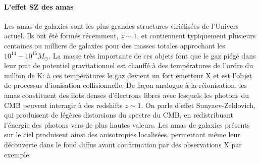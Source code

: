 \paragraph{L'effet SZ des amas}
Les amas de galaxies sont les plus grandes structures viriélisées de l'Univers actuel. Ils ont été formés récemment, $z\sim 1$, et contiennent typiquement plusieurs centaines ou milliers de galaxies pour des masses totales approchant les $10^{14}-10^{15} M_\odot$. La masse très importante de ces objets font que le gaz piégé dans leur puit de potentiel gravitationnel est chauffé à des températures de l'ordre du million de K: à ces températures le gaz devient un fort émetteur X et est l'objet de processus d'ionisation collisionnelle. De façon analogue à la réionisation, les amas constituent des ilots denses d'électrons libres avec lesquels les photons du CMB peuvent interagir à des redshifts $z\sim 1$. On parle d'effet Sunyaev-Zeldovich, qui produisent de légères distorsions du spectre du CMB, en redistribuant l'énergie des photons vers de plus hautes valeurs. Les amas de galaxies présents sur le ciel produisent ainsi des anisotropies localisées, permettant même leur découverte dans le fond diffus avant confirmation par des observations X par exemple.

